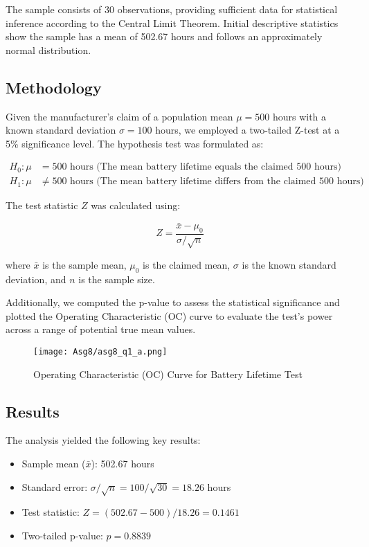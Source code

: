 \documentclass[12pt]{article}
\begin{document}
\noindent The sample consists of 30 observations, providing sufficient data for statistical inference according to the Central Limit Theorem. Initial descriptive statistics show the sample has a mean of 502.67 hours and follows an approximately normal distribution.

\subsection{Methodology}
Given the manufacturer's claim of a population mean $\mu = 500$ hours with a known standard deviation $\sigma = 100$ hours, we employed a two-tailed Z-test at a 5\% significance level. The hypothesis test was formulated as:

\begin{align}
H_0: \mu &= 500 \text{ hours (The mean battery lifetime equals the claimed 500 hours)} \\
H_1: \mu &\neq 500 \text{ hours (The mean battery lifetime differs from the claimed 500 hours)}
\end{align}

The test statistic $Z$ was calculated using:

\begin{equation}
Z = \frac{\bar{x} - \mu_0}{\sigma/\sqrt{n}}
\end{equation}

\noindent where $\bar{x}$ is the sample mean, $\mu_0$ is the claimed mean, $\sigma$ is the known standard deviation, and $n$ is the sample size.

Additionally, we computed the p-value to assess the statistical significance and plotted the Operating Characteristic (OC) curve to evaluate the test's power across a range of potential true mean values.

\begin{figure}[H]
    \centering
    \texttt{[image: Asg8/asg8\_q1\_a.png]}
    \caption{Operating Characteristic (OC) Curve for Battery Lifetime Test}
    \label{fig:enter-label}
\end{figure}

\subsection{Results}
The analysis yielded the following key results:

\begin{itemize}
    \item Sample mean ($\bar{x}$): 502.67 hours
    \item Standard error: $\sigma/\sqrt{n} = 100/\sqrt{30} = 18.26$ hours
    \item Test statistic: $Z = (502.67 - 500)/18.26 = 0.1461$
    \item Two-tailed p-value: $p = 0.8839$
\end{itemize}
\end{document}
